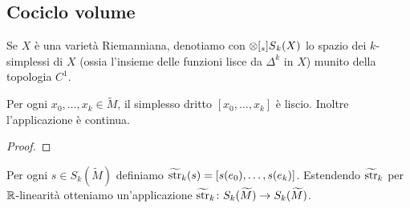 \subsection{Cociclo volume}
Se $X$ è una varietà Riemanniana, denotiamo con $\prepost[_s]{S}{_k}(X)$ lo spazio dei $k$-simplessi  di $X$ (ossia l'insieme delle funzioni lisce da $\Delta^k$ in $X$) munito della topologia $C^1$.

\begin{proposition}
Per ogni $x_0,\ldots,x_k\in\widetilde M$, il simplesso dritto $[x_0,\ldots,x_k]$ è liscio. Inoltre l'applicazione
è continua.
\end{proposition}
\begin{proof}

\end{proof}

Per ogni $s\in S_k(\widetilde M)$ definiamo $\widetilde{\operatorname{str}}_k(s)=[s(e_0),\ldots,s(e_k)]$. Estendendo $\widetilde{\operatorname{str}}_k$ per $\mathbb{R}$-linearità otteniamo un'applicazione $\map{\tstr_k}{S_k(\widetilde M)}{S_k(\widetilde M)}$.

